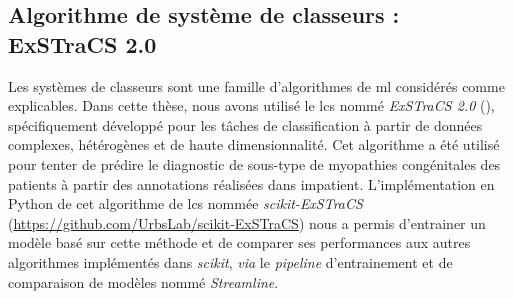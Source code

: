 \subsection{Algorithme de système de classeurs : ExSTraCS 2.0}
Les systèmes de classeurs sont une famille d'algorithmes de \gls{ml} considérés comme explicables. Dans cette thèse, nous avons utilisé le \gls{lcs} nommé \textit{ExSTraCS 2.0} (\cite{urbanowicz_exstracs_2015}), spécifiquement développé pour les tâches de classification à partir de données complexes, hétérogènes et de haute dimensionnalité. Cet algorithme a été utilisé pour tenter de prédire le diagnostic de sous-type de myopathies congénitales des patients à partir des annotations réalisées dans \gls{impatient}. L'implémentation en Python de cet algorithme de \gls{lcs} nommée \textit{scikit-ExSTraCS} (\url{https://github.com/UrbsLab/scikit-ExSTraCS}) nous a permis d'entrainer un modèle basé sur cette méthode et de comparer ses performances aux autres algorithmes implémentés dans \textit{scikit}, \textit{via} le \textit{pipeline} d'entrainement et de comparaison de modèles nommé \textit{Streamline}.

